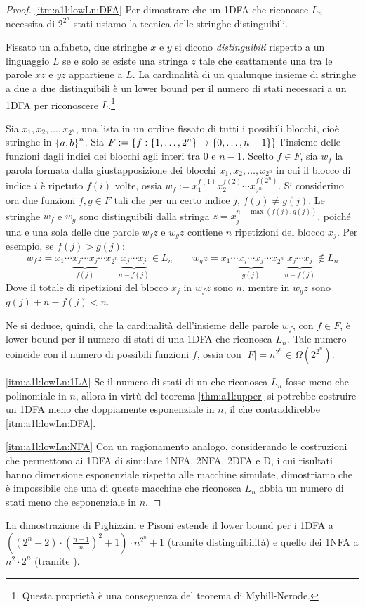 \begin{proof}
	\ref{itm:a1l:lowLn:DFA} Per dimostrare che un 1DFA che riconosce $L_n$ necessita di $2^{2^n}$ stati usiamo la tecnica delle stringhe distinguibili.

	Fissato un alfabeto, due stringhe $x$ e $y$ si dicono \emph{distinguibili} rispetto a un linguaggio $L$ se e solo se esiste una stringa $z$ tale che esattamente una tra le parole $xz$ e $yz$ appartiene a $L$. La cardinalità di un qualunque insieme di stringhe a due a due distinguibili è un lower bound per il numero di stati necessari a un 1DFA per riconoscere $L$.\footnote{Questa proprietà è una conseguenza del teorema di Myhill-Nerode.}

	Sia $x_1,x_2,\dots,x_{2^n}$, una lista in un ordine fissato di tutti i possibili blocchi, cioè stringhe in $\left\{ a,b \right\}^n$. Sia $F:=\left\{ f: \left\{ 1,\dots,2^n \right\}\to\left\{ 0,\dots,n-1 \right\} \right\}$ l'insieme delle funzioni dagli indici dei blocchi agli interi tra $0$ e $n-1$. Scelto $f\in F$, sia $w_f$ la parola formata dalla giustapposizione dei blocchi $x_1,x_2,\dots,x_{2^n}$ in cui il blocco di indice $i$ è ripetuto $f(i)$ volte, ossia $w_f:=x_1^{f(1)}x_2^{f(2)}\cdots x_{2^n}^{f(2^n)}$. Si considerino ora due funzioni $f,g\in F$ tali che per un certo indice $j$, $f(j)\neq g(j)$. Le stringhe $w_f$ e $w_g$ sono distinguibili dalla stringa $z=x_j^{n-\max(f(j),g(j))}$, poiché una e una sola delle due parole $w_fz$ e $w_gz$ contiene $n$ ripetizioni del blocco $x_j$. Per esempio, se $f(j)>g(j)$:
	\begin{equation*}
		w_fz=x_1\cdots \underbrace{x_j\cdots x_j}_{f(j)} \cdots x_{2^n}\underbrace{x_j\cdots x_j}_{n-f(j)}\in L_n \qquad w_gz=x_1\cdots \underbrace{x_j\cdots x_j}_{g(j)} \cdots x_{2^n}\underbrace{x_j\cdots x_j}_{n-f(j)}\notin L_n
	\end{equation*}
	Dove il totale di ripetizioni del blocco $x_j$ in $w_fz$ sono $n$, mentre in $w_gz$ sono $g(j)+n-f(j)<n$.

	Ne si deduce, quindi, che la cardinalità dell'insieme delle parole $w_f$, con $f\in F$, è lower bound per il numero di stati di una 1DFA che riconosca $L_n$. Tale numero coincide con il numero di possibili funzioni $f$, ossia con $|F|=n^{2^n}\in\Omega(2^{2^n})$.

	\ref{itm:a1l:lowLn:1LA} Se il numero di stati di un  che riconosca $L_n$ fosse meno che polinomiale in $n$, allora in virtù del teorema \ref{thm:a1l:upper} si potrebbe costruire un 1DFA meno che doppiamente esponenziale in $n$, il che contraddirebbe \ref{itm:a1l:lowLn:DFA}.

	\ref{itm:a1l:lowLn:NFA} Con un ragionamento analogo, considerando le costruzioni che permettono ai 1DFA di simulare 1NFA, 2NFA, 2DFA e D, i cui risultati hanno dimensione esponenziale rispetto alle macchine simulate, dimostriamo che è impossibile che una di queste macchine che riconosca $L_n$ abbia un numero di stati meno che esponenziale in $n$.
\end{proof}
\noindent La dimostrazione di Pighizzini e Pisoni \cite{Pighizzini:14:limitedRE} estende il lower bound per i 1DFA a $((2^n-2)\cdot(\frac{n-1}{n})^2+1)\cdot n^{2^n}+1$ (tramite distinguibilità) e quello dei 1NFA a $n^2\cdot2^n$ (tramite ).

